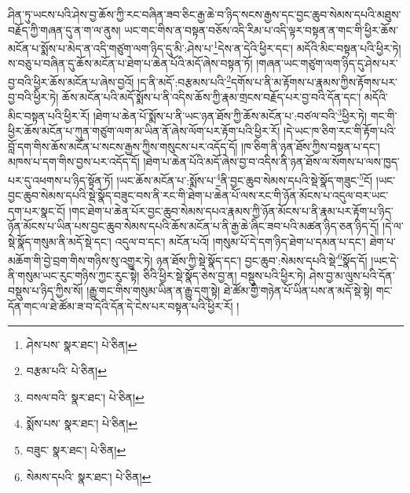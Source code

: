 ཤིན་ཏུ་ཡངས་པའི་ཤེས་བྱ་ཆོས་ཀྱི་རང་བཞིན་ཟབ་ཅིང་རྒྱ་ཆེ་བ་ཉིད་སངས་རྒྱས་དང་བྱང་ཆུབ་སེམས་དཔའི་མཐུས་བརྗོད་ཀྱི་གཞན་དུ་ན་ག་ལ་ནུས། ཡང་གང་གིས་ན་བསྟན་བཅོས་འདི་རིམ་པ་འདི་ལྟར་བསྟན་ན་གང་གི་ཕྱིར་ཆོས་མངོན་པ་སྨོས་པ་མེད་ན་འདི་གཙུག་ལག་ཉིད་དུ་མི་:ཤེས་པ་\footnote{ཤེས་པས་  སྣར་ཐང་།  པེ་ཅིན། }དེས་ན་དེའི་ཕྱིར་དང་། མདོའི་མིང་བསྟན་པའི་ཕྱིར་ཏེ། ས་བཅུ་པ་བཞིན་དུ་ཆོས་མངོན་པ་ཐེག་པ་ཆེན་པོའི་མདོ་ཞེས་བསྟན་ཏོ། །གཞན་ཡང་གཙུག་ལག་ཉིད་དུ་ཤེས་པར་བྱ་བའི་ཕྱིར་ཆོས་མངོན་པ་ཞེས་བྱའོ། །ད་ནི་མདོ་:བརྩམས་པའི་\footnote{བརྩམ་པའི་  པེ་ཅིན། }དགོས་པ་ནི་མ་རྟོགས་པ་རྣམས་ཀྱིས་རྟོགས་པར་བྱ་བའི་ཕྱིར་ཏེ། ཆོས་མངོན་པའི་མདོ་སྨོས་པ་ནི་འདིས་ཆོས་ཀྱི་རྣམ་གྲངས་བརྗོད་པར་བྱ་བའི་དོན་དང་། མདོའི་མིང་བསྟན་པའི་ཕྱིར་རོ། །ཐེག་པ་ཆེན་པོ་སྨོས་པ་ནི་ཡང་ཉན་ཐོས་ཀྱི་ཆོས་མངོན་པ་:བཙལ་བའི་\footnote{བསལ་བའི་  སྣར་ཐང་།  པེ་ཅིན། }ཕྱིར་ཏེ། གང་གི་ཕྱིར་ཆོས་མངོན་པ་ཀུན་གཙུག་ལག་མ་ཡིན་ནོ་ཞེས་ལོག་པར་རྟོག་པའི་ཕྱིར་རོ། །དེ་ཡང་ཁ་ཅིག་རང་གི་རྟོག་པའི་བློ་དག་གིས་ཆོས་མངོན་པ་སངས་རྒྱས་ཀྱིས་གསུངས་པར་འདོད་དོ། །ཁ་ཅིག་ནི་ཉན་ཐོས་ཀྱིས་བསྟན་པ་དང་། མཁས་པ་དག་གིས་བྱས་པར་འདོད་དོ། །ཐེག་པ་ཆེན་པོའི་མདོ་ཞེས་བྱ་བ་འདིས་ནི་ཉན་ཐོས་ལ་སོགས་པ་ལས་ཁྱད་པར་དུ་འཕགས་པ་ཉིད་སྟོན་ཏོ། །ཡང་ཆོས་མངོན་པ་:སྨོས་པ་\footnote{སྨོས་པས་  སྣར་ཐང་།  པེ་ཅིན། }ནི་བྱང་ཆུབ་སེམས་དཔའི་སྡེ་སྣོད་གཟུང་\footnote{བཟུང་  སྣར་ཐང་།  པེ་ཅིན། }ངོ། །ཡང་བྱང་ཆུབ་སེམས་དཔའི་སྡེ་སྣོད་བཟུང་བས་ནི་རང་གི་ཐེག་པ་ཆེན་པོ་ལས་རང་གི་ཉོན་མོངས་པ་འདུལ་བར་ཡང་དག་པར་སྣང་ངོ། །གང་ཐེག་པ་ཆེན་པོར་བྱང་ཆུབ་སེམས་དཔའ་རྣམས་ཀྱི་ཉོན་མོངས་པ་ནི་རྣམ་པར་རྟོག་པ་ཉིད་ཉོན་མོངས་པ་ཡིན་པས་བྱང་ཆུབ་སེམས་དཔའི་ཆོས་མངོན་པ་ནི་རྒྱ་ཆེ་ཞིང་ཟབ་པའི་མཚན་ཉིད་ཅན་ཉིད་དོ། །དེ་ལ་སྡེ་སྣོད་གསུམ་ནི་མདོ་སྡེ་དང་། འདུལ་བ་དང་། མངོན་པའོ། །གསུམ་པོ་དེ་དག་ཉིད་ཐེག་པ་དམན་པ་དང་། ཐེག་པ་མཆོག་གི་བྱེ་བྲག་གིས་གཉིས་སུ་འགྱུར་ཏེ། ཉན་ཐོས་ཀྱི་སྡེ་སྣོད་དང་། བྱང་ཆུབ་:སེམས་དཔའི་སྡེ་\footnote{སེམས་དཔའི་  སྣར་ཐང་།  པེ་ཅིན། }སྣོད་དོ། །ཡང་དེ་ནི་གསུམ་ཡང་རུང་གཉིས་ཀྱང་རུང་སྟེ། ཅིའི་ཕྱིར་སྡེ་སྣོད་ཅེས་བྱ་ན། བསྡུས་པའི་ཕྱིར་ཏེ། ཤེས་བྱ་མ་ལུས་པའི་དོན་བསྡུས་པ་ཉིད་ཀྱིས་སོ། །རྒྱུ་གང་གིས་གསུམ་ཡིན་ན་རྒྱུ་དགུ་སྟེ། ཐེ་ཚོམ་གྱི་གཉེན་པོ་ཡིན་པས་ན་མདོ་སྡེ་སྟེ། གང་དོན་གང་ལ་ཐེ་ཚོམ་ཟ་བ་དེའི་དོན་དེ་ངེས་པར་བསྟན་པའི་ཕྱིར་རོ། །
